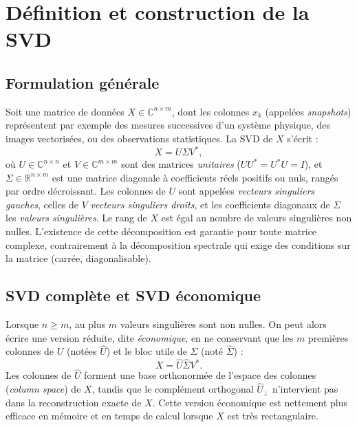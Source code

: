 \documentclass[11pt,a4paper]{article}
\newcommand{\R}{\mathbb{R}}
\newcommand{\C}{\mathbb{C}}
\begin{document}
\section{Définition et construction de la SVD}

\subsection{Formulation générale}

Soit une matrice de données $X \in \C^{n \times m}$, dont les colonnes $x_k$ (appelées \emph{snapshots}) représentent par exemple des mesures successives d'un système physique, des images vectorisées, ou des observations statistiques. La SVD de $X$ s'écrit :
\begin{equation}
X = U \Sigma V^{*},
\end{equation}
où $U \in \C^{n\times n}$ et $V \in \C^{m \times m}$ sont des matrices \emph{unitaires} ($UU^{*}=U^{*}U=I$), et $\Sigma \in \R^{n \times m}$ est une matrice diagonale à coefficients réels positifs ou nuls, rangés par ordre décroissant. Les colonnes de $U$ sont appelées \emph{vecteurs singuliers gauches}, celles de $V$ \emph{vecteurs singuliers droits}, et les coefficients diagonaux de $\Sigma$ les \emph{valeurs singulières}. Le rang de $X$ est égal au nombre de valeurs singulières non nulles. L'existence de cette décomposition est garantie pour toute matrice complexe, contrairement à la décomposition spectrale qui exige des conditions sur la matrice (carrée, diagonalisable).

\subsection{SVD complète et SVD économique}

Lorsque $n \geq m$, au plus $m$ valeurs singulières sont non nulles. On peut alors écrire une version réduite, dite \emph{économique}, en ne conservant que les $m$ premières colonnes de $U$ (notées $\hat U$) et le bloc utile de $\Sigma$ (noté $\hat \Sigma$) :
\begin{equation}
X = \hat U \hat \Sigma V^{*}.
\end{equation}
Les colonnes de $\hat U$ forment une base orthonormée de l'espace des colonnes (\emph{column space}) de $X$, tandis que le complément orthogonal $\hat U_{\perp}$ n'intervient pas dans la reconstruction exacte de $X$. Cette version économique est nettement plus efficace en mémoire et en temps de calcul lorsque $X$ est très rectangulaire.
\end{document}
